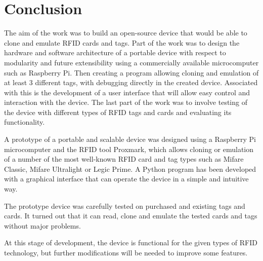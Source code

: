 \chapter{Conclusion}





The aim of the work was to build an open-source device that would be able to clone and emulate RFID cards and tags. Part of the work was to design the hardware and software architecture of a portable device with respect to modularity and future extensibility using a commercially available microcomputer such as Raspberry Pi. Then creating a program allowing cloning and emulation of at least 3 different tags, with debugging directly in the created device. Associated with this is the development of a user interface that will allow easy control and interaction with the device. The last part of the work was to involve testing of the device with different types of RFID tags and cards and evaluating its functionality.

A prototype of a portable and scalable device was designed using a Raspberry Pi microcomputer and the RFID tool Proxmark, which allows cloning or emulation of a number of the most well-known RFID card and tag types such as Mifare Classic, Mifare Ultralight or Legic Prime. A Python program has been developed with a graphical interface that can operate the device in a simple and intuitive way.

The prototype device was carefully tested on purchased and existing tags and cards. It turned out that it can read, clone and emulate the tested cards and tags without major problems.

At this stage of development, the device is functional for the given types of RFID technology, but further modifications will be needed to improve some features.
